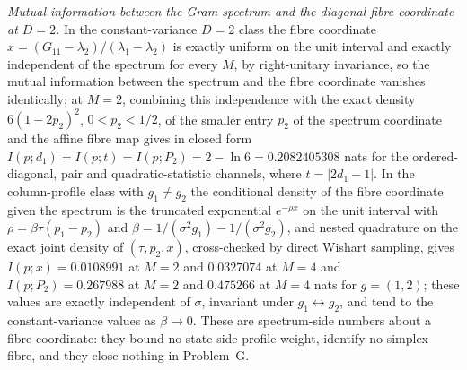\emph{Mutual information between the Gram spectrum and the diagonal fibre coordinate at \(D=2\).} In the constant-variance \(D=2\) class the fibre coordinate \(x=(G_{11}-\lambda_{2})/(\lambda_{1}-\lambda_{2})\) is exactly uniform on the unit interval and exactly independent of the spectrum for every \(M\), by right-unitary invariance, so the mutual information between the spectrum and the fibre coordinate vanishes identically; at \(M=2\), combining this independence with the exact density \(6(1-2p_{2})^{2}\), \(0<p_{2}<1/2\), of the smaller entry \(p_{2}\) of the spectrum coordinate and the affine fibre map gives in closed form \(I(p;d_{1})=I(p;t)=I(p;P_{2})=2-\ln 6=0.2082405308\) nats for the ordered-diagonal, pair and quadratic-statistic channels, where \(t=|2d_{1}-1|\). In the column-profile class with \(g_{1}\neq g_{2}\) the conditional density of the fibre coordinate given the spectrum is the truncated exponential \(e^{-\rho x}\) on the unit interval with \(\rho=\beta\tau(p_{1}-p_{2})\) and \(\beta=1/(\sigma^{2}g_{1})-1/(\sigma^{2}g_{2})\), and nested quadrature on the exact joint density of \((\tau,p_{2},x)\), cross-checked by direct Wishart sampling, gives \(I(p;x)=0.0108991\) at \(M=2\) and \(0.0327074\) at \(M=4\) and \(I(p;P_{2})=0.267988\) at \(M=2\) and \(0.475266\) at \(M=4\) nats for \(g=(1,2)\); these values are exactly independent of \(\sigma\), invariant under \(g_{1}\leftrightarrow g_{2}\), and tend to the constant-variance values as \(\beta\to 0\). These are spectrum-side numbers about a fibre coordinate: they bound no state-side profile weight, identify no simplex fibre, and they close nothing in Problem~G.


